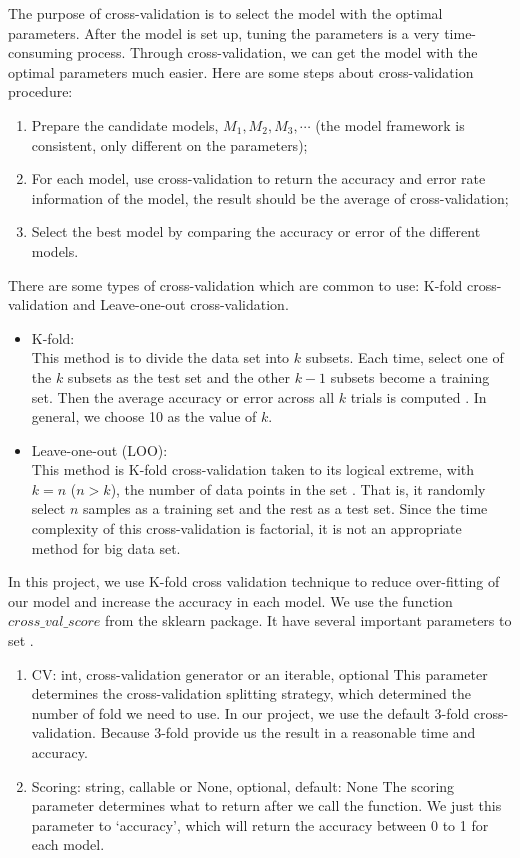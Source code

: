 \documentclass[sigconf]{acmart}
\begin{document}
The purpose of cross-validation is to select the model with the optimal parameters. After the model is set up, tuning the parameters is a very time-consuming process. Through cross-validation, we can get the model with the optimal parameters much easier. Here are some steps about cross-validation procedure:
\begin{enumerate}
    \item Prepare the candidate models, $M_1,M_2,M_3,\cdots$ (the model framework is consistent, only different on the parameters);
    \item For each model, use cross-validation to return the accuracy and error rate information of the model, the result should be the average of cross-validation;
    \item Select the best model by comparing the accuracy or error of the different models.
\end{enumerate}

There are some types of cross-validation which are common to use: K-fold cross-validation and Leave-one-out cross-validation.
\begin{itemize}
    \item K-fold: \\
    This method is to divide the data set into $k$ subsets. Each time, select one of the $k$ subsets as the test set and the other $k-1$ subsets become a training set. Then the average accuracy or error across all $k$ trials is computed \cite{10f.cv}. In general, we choose 10 as the value of $k$. 
    \item Leave-one-out (LOO): \\
    This method is K-fold cross-validation taken to its logical extreme, with $k=n$ ($n>k$), the number of data points in the set \cite{10f.cv}. That is, it randomly select $n$ samples as a training set and the rest as a test set. Since the time complexity of this cross-validation is factorial, it is not an appropriate method for big data set.
\end{itemize}

In this project, we use K-fold cross validation technique to reduce over-fitting of our model and increase the accuracy in each model. We use the function $cross\_val\_score$ from the sklearn package. It have several important parameters to set \cite{sklearn.cv}.

\begin{enumerate}
    \item CV: int, cross-validation generator or an iterable, optional
    This parameter determines the cross-validation splitting strategy, which determined the number of fold we need to use. In our project, we use the default 3-fold cross-validation. Because 3-fold provide us the result in a reasonable time and accuracy.
    \item Scoring: string, callable or None, optional, default: None
    The scoring parameter determines what to return after we call the function. We just this parameter to `accuracy', which will return the accuracy between 0 to 1 for each model.
\end{enumerate}
\end{document}
